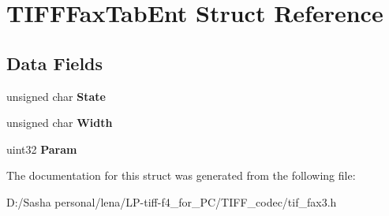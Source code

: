 \hypertarget{struct_t_i_f_f_fax_tab_ent}{}\section{T\+I\+F\+F\+Fax\+Tab\+Ent Struct Reference}
\label{struct_t_i_f_f_fax_tab_ent}
\subsection*{Data Fields}
\begin{DoxyCompactItemize}
\item 
\hypertarget{struct_t_i_f_f_fax_tab_ent_a1d6882448e12d8dd746feef3f02f911e}{}unsigned char {\bfseries State}\label{struct_t_i_f_f_fax_tab_ent_a1d6882448e12d8dd746feef3f02f911e}

\item 
\hypertarget{struct_t_i_f_f_fax_tab_ent_a79fd826dc7694cfcf82aaf83eea98fa1}{}unsigned char {\bfseries Width}\label{struct_t_i_f_f_fax_tab_ent_a79fd826dc7694cfcf82aaf83eea98fa1}

\item 
\hypertarget{struct_t_i_f_f_fax_tab_ent_a3c90bd546a3a49fe8b7e9ea700b9c30a}{}uint32 {\bfseries Param}\label{struct_t_i_f_f_fax_tab_ent_a3c90bd546a3a49fe8b7e9ea700b9c30a}

\end{DoxyCompactItemize}


The documentation for this struct was generated from the following file\+:\begin{DoxyCompactItemize}
\item 
D\+:/\+Sasha personal/lena/\+L\+P-\/tiff-\/f4\+\_\+for\+\_\+\+P\+C/\+T\+I\+F\+F\+\_\+codec/tif\+\_\+fax3.\+h\end{DoxyCompactItemize}
